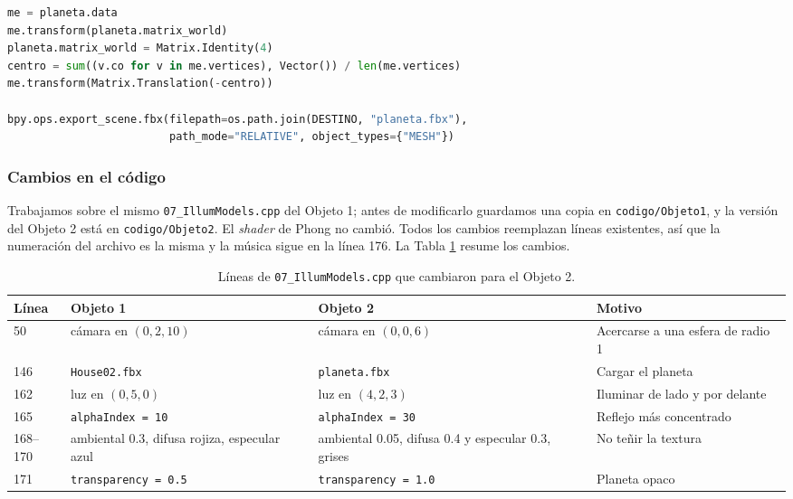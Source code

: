 \begin{lstlisting}[language=Python, caption={Centrado y exportación del planeta en exportar\_planeta.py.}, label={lst:exportar_planeta}]
me = planeta.data
me.transform(planeta.matrix_world)
planeta.matrix_world = Matrix.Identity(4)
centro = sum((v.co for v in me.vertices), Vector()) / len(me.vertices)
me.transform(Matrix.Translation(-centro))

bpy.ops.export_scene.fbx(filepath=os.path.join(DESTINO, "planeta.fbx"),
                         path_mode="RELATIVE", object_types={"MESH"})
\end{lstlisting}

\subsubsection{Cambios en el código}
Trabajamos sobre el mismo \texttt{07\_IllumModels.cpp} del Objeto 1; antes de modificarlo guardamos una copia en \texttt{codigo/Objeto1}, y la versión del Objeto 2 está en \texttt{codigo/Objeto2}. El \textit{shader} de Phong no cambió. Todos los cambios reemplazan líneas existentes, así que la numeración del archivo es la misma y la música sigue en la línea 176. La Tabla \ref{tab:cambios_objeto2} resume los cambios.

\begin{table}[H]
\centering
\renewcommand{\arraystretch}{1.25}
\begin{tabular}{|p{1.3cm}|p{4.6cm}|p{4.6cm}|p{3.8cm}|}
\hline
\textbf{Línea} & \textbf{Objeto 1} & \textbf{Objeto 2} & \textbf{Motivo} \\ \hline
50 & cámara en $(0, 2, 10)$ & cámara en $(0, 0, 6)$ & Acercarse a una esfera de radio 1 \\ \hline
146 & \texttt{House02.fbx} & \texttt{planeta.fbx} & Cargar el planeta \\ \hline
162 & luz en $(0, 5, 0)$ & luz en $(4, 2, 3)$ & Iluminar de lado y por delante \\ \hline
165 & \texttt{alphaIndex = 10} & \texttt{alphaIndex = 30} & Reflejo más concentrado \\ \hline
168--170 & ambiental 0.3, difusa rojiza, especular azul & ambiental 0.05, difusa 0.4 y especular 0.3, grises & No teñir la textura \\ \hline
171 & \texttt{transparency = 0.5} & \texttt{transparency = 1.0} & Planeta opaco \\ \hline
\end{tabular}
\caption{Líneas de \texttt{07\_IllumModels.cpp} que cambiaron para el Objeto 2.}
\label{tab:cambios_objeto2}
\end{table}

